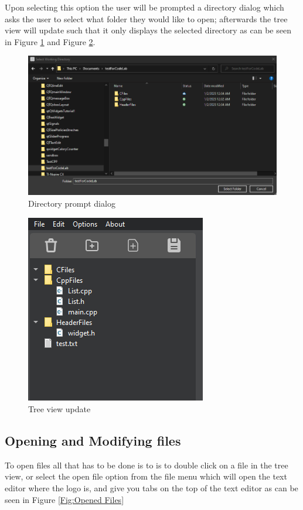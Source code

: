 \documentclass[a4paper, 11pt]{article}
\begin{document}
				\noindent Upon selecting this option the user will be prompted a directory dialog which asks the user to select what folder they would like to open; afterwards the tree view will update such that it only displays the selected directory as can be seen in Figure \ref{Fig:Directory prompt dialog} and Figure \ref{Fig:Tree view update}.
				
				\begin{figure}[h]
					\centering
					\includegraphics[width = .9\linewidth]{directoryDialogPromt}
					\caption{Directory prompt dialog}
					\label{Fig:Directory prompt dialog}
				\end{figure}
				\pagebreak
				
				\begin{figure}[h]
					\centering
					\includegraphics[width = .3\linewidth]{updatedTreeView}
					\caption{Tree view update}
					\label{Fig:Tree view update}
				\end{figure}
			
			\subsection{Opening and Modifying files}
				\noindent To open files all that has to be done is to is to double click on a file in the tree view, or select the open file option from the file menu which will open the text editor where the logo is, and give you tabs on the top of the text editor as can be seen in Figure \ref{Fig:Opened Files}
				
\end{document}
